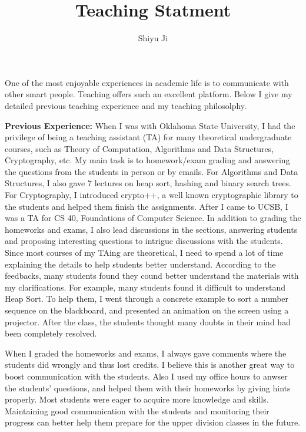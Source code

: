 \documentclass[12pt]{article}
\begin{document}
\title{Teaching Statment}
\author{Shiyu Ji}\date{}
\maketitle

One of the most enjoyable experiences in academic life is to communicate with other smart people. Teaching offers such an excellent platform. Below I give my detailed previous teaching experience and my teaching philosolphy.

{\bf Previous Experience:} When I was with Oklahoma State University, I had the privilege of being a teaching assistant (TA) for many theoretical undergraduate courses, such as Theory of Computation, Algorithms and Data Structures, Cryptography, etc. My main task is to homework/exam grading and answering the questions from the students in person or by emails. For Algorithms and Data Structures, I also gave 7 lectures on heap sort, hashing and binary search trees. For Cryptography, I introduced crypto++, a well known cryptographic library to the students and helped them finish the assignments. 
After I came to UCSB, I was a TA for CS 40, Foundations of Computer Science. In addition to grading the homeworks and exams, I also lead discussions in the sections, answering students and proposing interesting questions to intrigue discussions with the students. Since most courses of my TAing are theoretical, I need to spend a lot of time explaining the details to help students better understand. According to the feedbacks, many students found they cound better understand the materials with my clarifications. For example, many students found it difficult to understand Heap Sort. To help them, I went through a concrete example to sort a number sequence on the blackboard, and presented an animation on the screen using a projector. After the class, the students thought many doubts in their mind had been completely resolved. 

When I graded the homeworks and exams, I always gave comments where the students did wrongly and thus lost credits. I believe this is another great way to boost communication with the students. Also I used my office hours to anwser the students' questions, and helped them with their homeworks by giving hints properly. Most students were eager to acquire more knowledge and skills. Maintaining good communication with the students and monitoring their progress can better help them prepare for the upper division classes in the future. 
\end{document}
